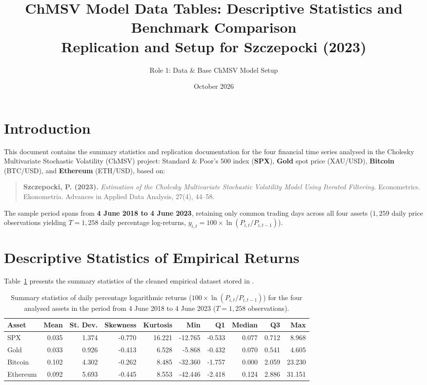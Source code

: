 \documentclass[11pt,a4paper]{article}
\title{\textbf{ChMSV Model Data Tables: Descriptive Statistics and Benchmark Comparison}\\[0.5em]
\large Replication and Setup for Szczepocki (2023)}
\author{Role 1: Data \& Base ChMSV Model Setup}
\date{October 2026}
\begin{document}
\maketitle

\section{Introduction}
This document contains the summary statistics and replication documentation for the four financial time series analysed in the Cholesky Multivariate Stochastic Volatility (ChMSV) project: Standard \& Poor's 500 index (\textbf{SPX}), \textbf{Gold} spot price (XAU/USD), \textbf{Bitcoin} (BTC/USD), and \textbf{Ethereum} (ETH/USD), based on:
\begin{quote}
\small
\textbf{Szczepocki, P. (2023).} \emph{Estimation of the Cholesky Multivariate Stochastic Volatility Model Using Iterated Filtering.} Econometrics. Ekonometria. Advances in Applied Data Analysis, 27(4), 44--58.
\end{quote}

The sample period spans from \textbf{4 June 2018 to 4 June 2023}, retaining only common trading days across all four assets ($1{,}259$ daily price observations yielding $T = 1{,}258$ daily percentage log-returns, $y_{i,t} = 100 \times \ln(P_{i,t}/P_{i,t-1})$).

\section{Descriptive Statistics of Empirical Returns}

Table~\ref{tab:descriptive_statistics} presents the summary statistics of the cleaned empirical dataset stored in .

\begin{table}[htbp]
\centering
\caption{Summary statistics of daily percentage logarithmic returns ($100 \times \ln(P_{i,t}/P_{i,t-1})$) for the four analysed assets in the period from 4 June 2018 to 4 June 2023 ($T = 1{,}258$ observations).}
\label{tab:descriptive_statistics}
\vspace{0.5em}
\setlength{\tabcolsep}{5pt}
\begin{tabular}{lrrrrrrrrr}
\toprule
\textbf{Asset} & \textbf{Mean} & \textbf{St. Dev.} & \textbf{Skewness} & \textbf{Kurtosis} & \textbf{Min} & \textbf{Q1} & \textbf{Median} & \textbf{Q3} & \textbf{Max} \\
\midrule
SPX      & 0.035 & 1.374 & -0.770 & 16.221 & -12.765 & -0.533 & 0.077 & 0.712 &  8.968 \\
Gold     & 0.033 & 0.926 & -0.413 &  6.528 &  -5.868 & -0.432 & 0.070 & 0.541 &  4.605 \\
Bitcoin  & 0.102 & 4.302 & -0.262 &  8.485 & -32.360 & -1.757 & 0.000 & 2.059 & 23.230 \\
Ethereum & 0.092 & 5.693 & -0.445 &  8.553 & -42.446 & -2.418 & 0.124 & 2.886 & 31.151 \\
\bottomrule
\end{tabular}
\end{table}
\end{document}
